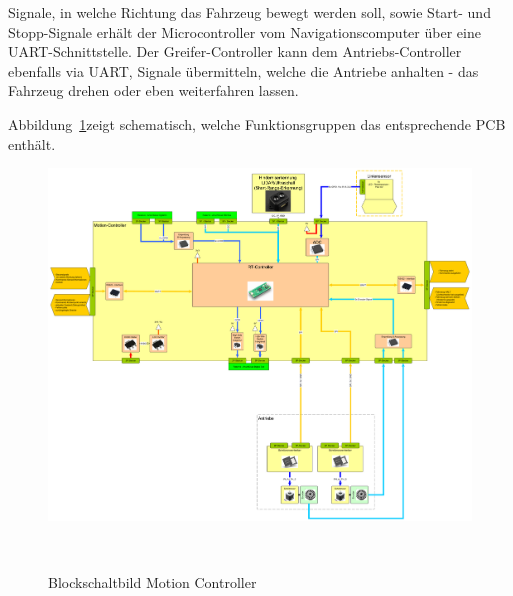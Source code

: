 \documentclass[main.tex]{subfiles} %
\begin{document}
Signale, in welche Richtung das Fahrzeug bewegt werden soll, sowie Start- und
Stopp-Signale erhält der Microcontroller vom Navigationscomputer über eine
UART-Schnittstelle. Der Greifer-Controller kann dem Antriebs-Controller
ebenfalls via UART, Signale übermitteln, welche die Antriebe anhalten - das
Fahrzeug drehen oder eben weiterfahren lassen.

Abbildung~\ref{fig:Blockschaltbild_Motioncontroller}zeigt schematisch, welche
Funktionsgruppen das entsprechende PCB enthält.

\begin{figure}[H]
    \centering
    \includegraphics[width = 1\linewidth]{fig_Antriebe_und_Dimensionierung/MotionController_Blockschaltbild.pdf}
    \caption{Blockschaltbild Motion Controller}~\label{fig:Blockschaltbild_Motioncontroller}
\end{figure}
\end{document}
